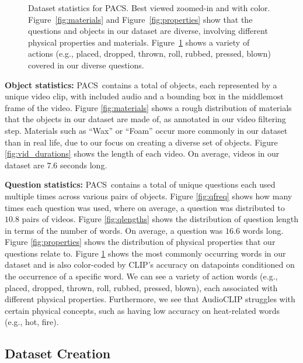 \documentclass[runningheads]{llncs}
\newcommand{\names}{\textsc{PACS}}
\begin{document}
\begin{figure}[t!]
\begin{subfigure}{\textwidth}
      \label{fig:common_words}
    \end{subfigure}
    \caption{Dataset statistics for \names. Best viewed zoomed-in and with color. Figure~\ref{fig:materials} and Figure~\ref{fig:properties} show that the questions and objects in our dataset are diverse, involving different physical properties and materials. Figure~\ref{fig:common_words} shows a variety of actions (e.g., placed, dropped, thrown, roll, rubbed, pressed, blown) covered in our diverse questions.}
\label{fig:dataset_stats}
\end{figure}

\noindent \textbf{Object statistics:} \names\ contains a total of  objects, each represented by a unique video clip, with included audio and a bounding box in the middlemost frame of the video. Figure \ref{fig:materials} shows a rough distribution of materials that the objects in our dataset are made of, as annotated in our video filtering step. Materials such as ``Wax'' or ``Foam'' occur more commonly in our dataset than in real life, due to our focus on creating a diverse set of objects. Figure \ref{fig:vid_durations} shows the length of each video. On average, videos in our dataset are $7.6$ seconds long.


\noindent \textbf{Question statistics:} \names\ contains a total of  unique questions each used multiple times across various pairs of objects. Figure \ref{fig:qfreq} shows how many times each question was used, where on average, a question was distributed to $10.8$ pairs of videos. Figure \ref{fig:qlengths} shows the distribution of question length in terms of the number of words. On average, a question was $16.6$ words long. Figure \ref{fig:properties} shows the distribution of physical properties that our questions relate to. Figure \ref{fig:common_words} shows the most commonly occurring words in our dataset and is also color-coded by CLIP's accuracy on datapoints conditioned on the occurrence of a specific word. We can see a variety of action words (e.g., placed, dropped, thrown, roll, rubbed, pressed, blown), each associated with different physical properties. Furthermore, we see that AudioCLIP struggles with certain physical concepts, such as having low accuracy on heat-related words (e.g., hot, fire).

\subsection{Dataset Creation}
\end{document}
